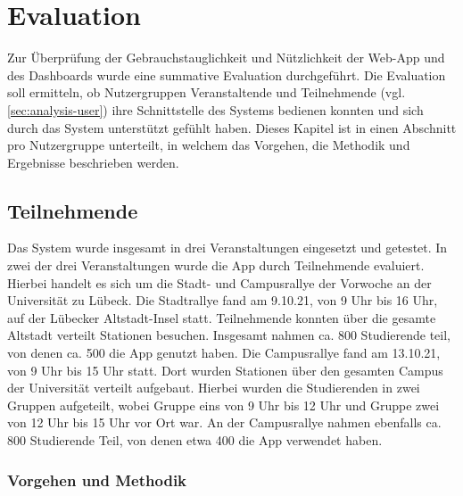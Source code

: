 \chapter{Evaluation} \label{chapter:evaluation}

Zur Überprüfung der Gebrauchstauglichkeit und Nützlichkeit der Web-App und des
Dashboards wurde eine summative Evaluation durchgeführt. Die Evaluation soll
ermitteln, ob Nutzergruppen Veranstaltende und Teilnehmende (vgl.
\autoref{sec:analysis-user}) ihre Schnittstelle des Systems bedienen konnten und
sich durch das System unterstützt gefühlt haben. Dieses Kapitel ist in einen
Abschnitt pro Nutzergruppe unterteilt, in welchem das Vorgehen, die Methodik und
Ergebnisse beschrieben werden.

\section{Teilnehmende}

Das System wurde insgesamt in drei Veranstaltungen eingesetzt und getestet. In
zwei der drei Veranstaltungen wurde die App durch Teilnehmende evaluiert.
Hierbei handelt es sich um die Stadt- und Campusrallye der Vorwoche an der
Universität zu Lübeck. Die Stadtrallye fand am 9.10.21, von 9 Uhr bis 16 Uhr,
auf der Lübecker Altstadt-Insel statt. Teilnehmende konnten über die gesamte
Altstadt verteilt Stationen besuchen. Insgesamt nahmen ca. 800 Studierende teil,
von denen ca. 500 die App genutzt haben. Die Campusrallye fand am 13.10.21, von
9 Uhr bis 15 Uhr statt. Dort wurden Stationen über den gesamten Campus der
Universität verteilt aufgebaut. Hierbei wurden die Studierenden in zwei Gruppen
aufgeteilt, wobei Gruppe eins von 9 Uhr bis 12 Uhr und Gruppe zwei von 12 Uhr
bis 15 Uhr vor Ort war. An der Campusrallye nahmen ebenfalls ca. 800 Studierende
Teil, von denen etwa 400 die App verwendet haben.



\subsection{Vorgehen und Methodik}


